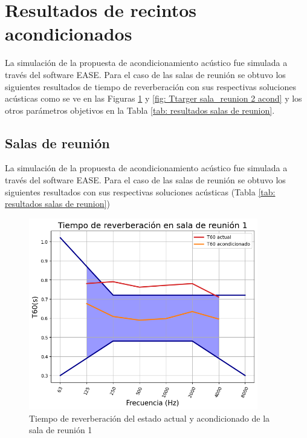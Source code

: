 \section{Resultados de recintos acondicionados}
La simulación de la propuesta de acondicionamiento acústico fue simulada a través del software EASE. Para el caso de las salas de reunión se obtuvo los siguientes resultados de tiempo de reverberación con sus respectivas soluciones acústicas 
como se ve en las Figuras \ref{fig: Ttarger sala_reunion 1 acond} y \ref{fig: Ttarger sala_reunion 2 acond} y los otros parámetros objetivos en la Tabla \ref{tab: resultados salas de reunion}.
\subsection{Salas de reunión}
La simulación de la propuesta de acondicionamiento acústico fue simulada a través del software EASE. Para el caso de las salas de reunión se obtuvo los siguientes resultados con sus respectivas soluciones acústicas (Tabla \ref{tab: resultados salas de reunion})
\begin{figure}[H]
    \centering
    \includegraphics[width=10cm]{Imagenes/DIN/DIN sala reunion 1 comparacion.png}
    \caption{Tiempo de reverberación del estado actual y acondicionado de la sala de reunión 1}
    \label{fig: Ttarger sala_reunion 1 acond}
\end{figure}
